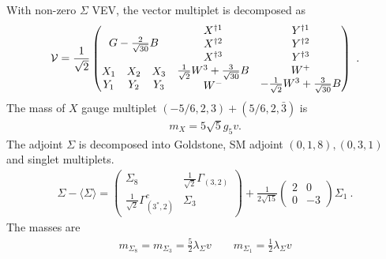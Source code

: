 \documentclass[12pt]{article}
\newcommand{\1}{\mbox{1}\hspace{-0.25em}\mbox{l}}
\begin{document}
With non-zero $\Sigma$ VEV, the vector multiplet is decomposed as
\begin{align}
 {\cal V}=\frac{1}{\sqrt{2}}
\begin{pmatrix}
 \begin{matrix}
G  -\frac{2}{\sqrt{30}} B
 \end{matrix}
&
\begin{matrix}
X^{\dagger 1} \\
X^{\dagger 2} \\
X^{\dagger 3}
\end{matrix}
&
\begin{matrix}
 Y^{\dagger 1}\\ Y^{\dagger 2} \\ Y^{\dagger 3}
\end{matrix}
\\
\begin{matrix}
 X_1 & X_2 & X_3 \\
 Y_1 & Y_2 & Y_3  
\end{matrix}
&
\begin{matrix}
 \frac{1}{\sqrt{2}}W^3+\frac{3}{\sqrt{30}}B \\ W^-
\end{matrix}
&
\begin{matrix}
W^+ \\ - \frac{1}{\sqrt{2}}W^3+\frac{3}{\sqrt{30}}B
\end{matrix}
\end{pmatrix}
~.
\end{align} 
The mass of $X$ gauge multiplet $ (-5/6, 2, 3)+ (5/6, 2, \bar{3})$ is
\begin{align}
m_X = 5 \sqrt{5} g_5 v.
\end{align}
The adjoint $\Sigma$ is decomposed into Goldstone, SM adjoint  $(0,1,8), (0,3,1)$ and singlet multiplets.
\begin{align}
\Sigma - \langle \Sigma  \rangle =
\begin{pmatrix}
 \Sigma_{8}& \frac{1}{\sqrt{2}}\Gamma_{(3,2)} \\
 \frac{1}{\sqrt{2}}\Gamma^{c}_{(3^*,2)} & \Sigma_3
\end{pmatrix}
+\frac{1}{2\sqrt{15}}
\begin{pmatrix}
 2&0\\0&-3
\end{pmatrix}
\Sigma_{1}~.
\end{align}
 The masses are 
\begin{align}
  m_{\Sigma_8} =  m_{\Sigma_3} = \frac{5}{2}\lambda_{\Sigma} v
\qquad
  m_{\Sigma_1} = \frac{1}{2}\lambda_{\Sigma} v
\label{eq:mu-GUT}
\end{align}
\end{document}

